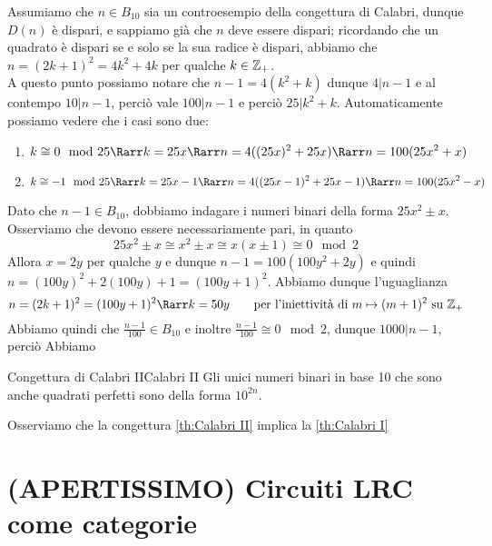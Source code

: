 \documentclass[openany]{book}
\begin{document}
Assumiamo che $n \in B_{10}$ sia un controesempio della congettura di Calabri, dunque $D(n)$ è dispari, e sappiamo già che $n$ deve essere dispari; ricordando che un quadrato è dispari se e solo se la sua radice è dispari, abbiamo che $n = (2k+1)^2 = 4k^2 + 4k$ per qualche $k \in \mathbb{Z}_+$.\\
A questo punto possiamo notare che $n-1 = 4(k^2 + k)$ dunque $4|n-1$ e al contempo $10| n-1$, perciò vale $100|n-1$ e perciò $25 | k^2 + k$. Automaticamente possiamo vedere che i casi sono due:
\begin{enumerate}
    \item \[ k \cong 0 \mod 25  \Rarr k = 25x \Rarr n = 4((25x)^2 + 25x) \Rarr n = 100(25x^2 + x )\]
    \item \[ k \cong -1 \mod 25 \Rarr k = 25x-1 \Rarr n = 4((25x-1)^2 + 25x - 1) \Rarr n = 100(25x^2 - x) \]
\end{enumerate}

Dato che $n-1 \in B_{10}$, dobbiamo indagare i numeri binari della forma $25x^2 \pm x$. Osserviamo che devono essere necessariamente pari, in quanto
\[ 25x^2 \pm x \cong x^2 \pm x \cong x(x \pm 1) \cong 0 \mod 2 \]
Allora $x = 2y$ per qualche $y$ e dunque $n-1 = 100(100y^2 + 2y)$ e quindi $n = (100y)^2 + 2(100y) + 1 = (100y +1)^2$. Abbiamo dunque l'uguaglianza
\[ n = (2k+1)^2 = (100y + 1)^2 \Rarr k = 50y \qquad \text{per l'iniettività di } m \mapsto (m+1)^2 \text{ su } \Z_+\] 
Abbiamo quindi che $\frac{n-1}{100} \in B_{10}$ e inoltre $\frac{n-1}{100} \cong 0 \mod 2$, dunque 
$1000|n-1$, perciò Abbiamo

\begin{theorem}{Congettura di Calabri II}{Calabri II}
    Gli unici numeri binari in base 10 che sono anche quadrati perfetti sono della forma $10^{2n}$.
\end{theorem}
Osserviamo che la congettura \ref{th:Calabri II} implica la \ref{th:Calabri I}

\chapter{(APERTISSIMO) Circuiti LRC come categorie}
\end{document}
